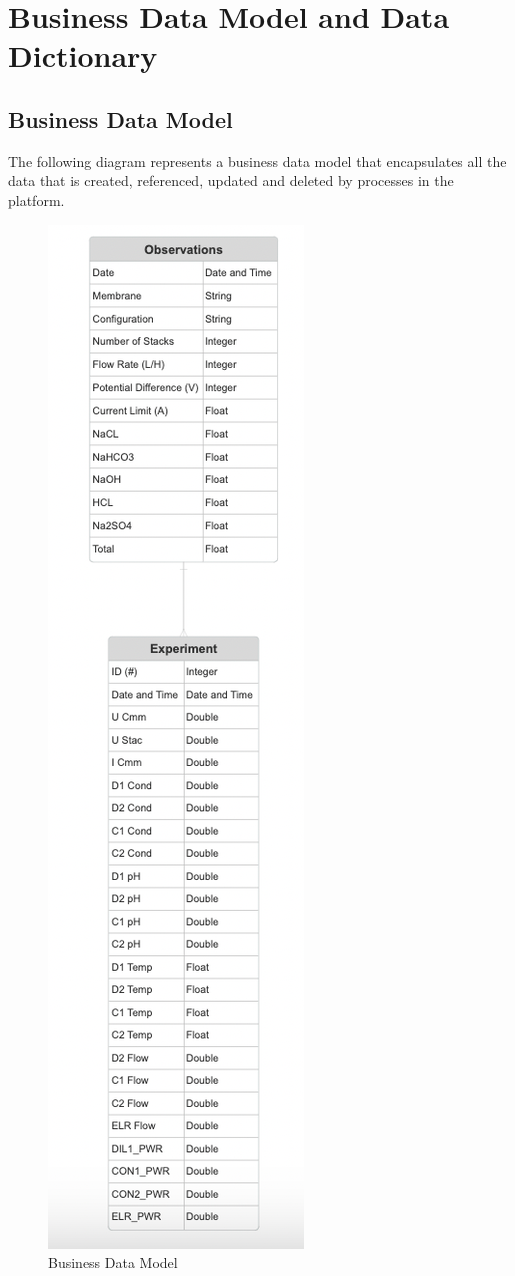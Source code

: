 \documentclass[12pt]{article}
\begin{document}
\section{Business Data Model and Data Dictionary}
\subsection{Business Data Model}
The following diagram represents a business data model that encapsulates all the data that is
created, referenced, updated and deleted by processes in the platform.

\begin{figure}[H]
  \centering
  \includegraphics[scale=0.98]{Diagrams/Business Data Model.png}
  \caption{Business Data Model}
\end{figure}
\end{document}
